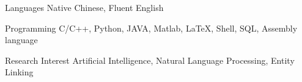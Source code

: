 

\begin{cvskills}


  \cvskill
    {Languages} %
    {Native Chinese, Fluent English} %


  \cvskill
    {Programming} %
    {C/C++, Python, JAVA, Matlab, LaTeX, Shell, SQL, Assembly language} %

  \cvskill
    {Research Interest} %
    {Artificial Intelligence, Natural Language Processing, Entity Linking} %

\end{cvskills}
